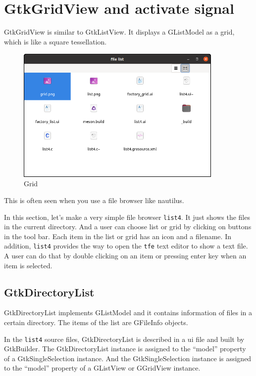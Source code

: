\hypertarget{gtkgridview-and-activate-signal}{%
\section{GtkGridView and activate
signal}\label{gtkgridview-and-activate-signal}}

GtkGridView is similar to GtkListView. It displays a GListModel as a
grid, which is like a square tessellation.

\begin{figure}
\centering
\includegraphics[width=10cm,height=6.6cm]{../image/list4.png}
\caption{Grid}
\end{figure}

This is often seen when you use a file browser like nautilus.

In this section, let's make a very simple file browser
\passthrough{\lstinline!list4!}. It just shows the files in the current
directory. And a user can choose list or grid by clicking on buttons in
the tool bar. Each item in the list or grid has an icon and a filename.
In addition, \passthrough{\lstinline!list4!} provides the way to open
the \passthrough{\lstinline!tfe!} text editor to show a text file. A
user can do that by double clicking on an item or pressing enter key
when an item is selected.

\hypertarget{gtkdirectorylist}{%
\subsection{GtkDirectoryList}\label{gtkdirectorylist}}

GtkDirectoryList implements GListModel and it contains information of
files in a certain directory. The items of the list are GFileInfo
objects.

In the \passthrough{\lstinline!list4!} source files, GtkDirectoryList is
described in a ui file and built by GtkBuilder. The GtkDirectoryList
instance is assigned to the ``model'' property of a GtkSingleSelection
instance. And the GtkSingleSelection instance is assigned to the
``model'' property of a GListView or GGridView instance.

